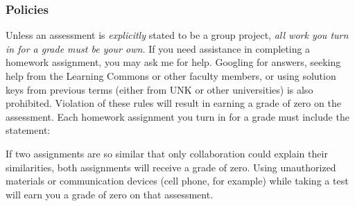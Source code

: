 \documentclass[12pt]{article}
\newcounter{ex}\setcounter{ex}{0}
\begin{document}
\subsubsection* {Policies}

Unless an assessment is \emph{explicitly} stated to be a group project,  \emph{all work you turn in for a grade must be your own.}  If you need assistance in completing a homework assignment, you may ask me for help. Googling for answers, seeking help from the Learning Commons or other faculty members,  or using solution keys from previous terms (either from UNK or other universities) is also prohibited.  Violation of these rules will result in earning a grade of zero on the assessment. Each homework assignment you turn in for a grade must include the statement:

\begin{quote}
\end{quote}
 If two assignments are so similar that only collaboration could explain their similarities, both assignments will receive a grade of zero.  Using unauthorized materials or communication devices (cell phone, for
example) while taking a test will earn you a grade of zero on that assessment.  
\end{document}
